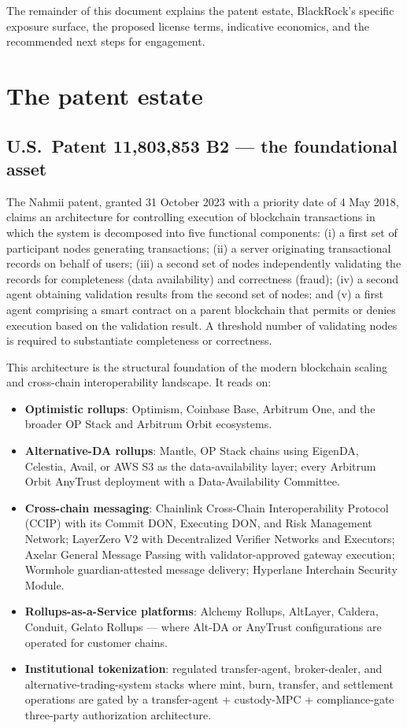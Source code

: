 \documentclass[11pt,letterpaper]{article}
\begin{document}
The remainder of this document explains the patent estate, BlackRock's specific exposure surface, the proposed license terms, indicative economics, and the recommended next steps for engagement.

\section{The patent estate}

\subsection{U.S.\ Patent 11{,}803{,}853 B2 --- the foundational asset}

The Nahmii patent, granted 31 October 2023 with a priority date of 4 May 2018, claims an architecture for controlling execution of blockchain transactions in which the system is decomposed into five functional components: (i) a first set of participant nodes generating transactions; (ii) a server originating transactional records on behalf of users; (iii) a second set of nodes independently validating the records for completeness (data availability) and correctness (fraud); (iv) a second agent obtaining validation results from the second set of nodes; and (v) a first agent comprising a smart contract on a parent blockchain that permits or denies execution based on the validation result. A threshold number of validating nodes is required to substantiate completeness or correctness.

This architecture is the structural foundation of the modern blockchain scaling and cross-chain interoperability landscape. It reads on:

\begin{itemize}
\item \textbf{Optimistic rollups}: Optimism, Coinbase Base, Arbitrum One, and the broader OP Stack and Arbitrum Orbit ecosystems.
\item \textbf{Alternative-DA rollups}: Mantle, OP Stack chains using EigenDA, Celestia, Avail, or AWS S3 as the data-availability layer; every Arbitrum Orbit AnyTrust deployment with a Data-Availability Committee.
\item \textbf{Cross-chain messaging}: Chainlink Cross-Chain Interoperability Protocol (CCIP) with its Commit DON, Executing DON, and Risk Management Network; LayerZero V2 with Decentralized Verifier Networks and Executors; Axelar General Message Passing with validator-approved gateway execution; Wormhole guardian-attested message delivery; Hyperlane Interchain Security Module.
\item \textbf{Rollups-as-a-Service platforms}: Alchemy Rollups, AltLayer, Caldera, Conduit, Gelato Rollups --- where Alt-DA or AnyTrust configurations are operated for customer chains.
\item \textbf{Institutional tokenization}: regulated transfer-agent, broker-dealer, and alternative-trading-system stacks where mint, burn, transfer, and settlement operations are gated by a transfer-agent + custody-MPC + compliance-gate three-party authorization architecture.
\end{itemize}
\end{document}
